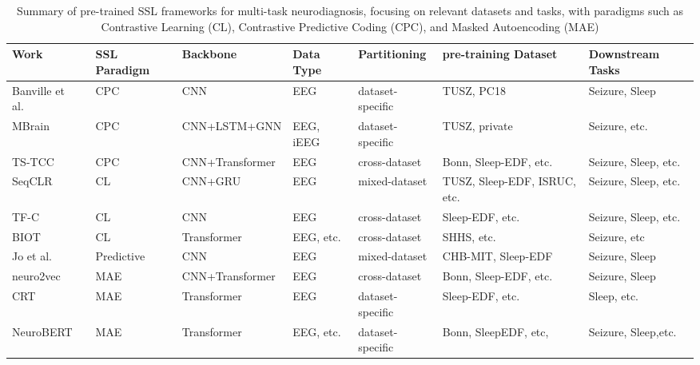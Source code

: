 \begin{table*}[t]
\renewcommand{\arraystretch}{1.2}
\caption{Summary of pre-trained SSL frameworks for multi-task neurodiagnosis, focusing on relevant datasets and tasks, with paradigms such as Contrastive Learning (CL), Contrastive Predictive Coding (CPC), and Masked Autoencoding (MAE)}
\label{tab:pts}
\footnotesize
\centering
\begin{tabular}
{p{2.1cm}p{1.9cm}p{2.1cm}p{1.4cm}p{1.8cm}p{3.7cm}p{2.5cm}}
\hline
\textbf{Work}        & \textbf{SSL Paradigm}                                     & \textbf{Backbone}  & \textbf{Data Type} &\textbf{Partitioning}  & \textbf{pre-training Dataset}                          & \textbf{Downstream Tasks}                           \\
\hline
Banville et al.~\cite{banville2021uncovering} & CPC & CNN & EEG & dataset-specific & TUSZ, PC18  & Seizure, Sleep  \\
MBrain~\cite{cai2023mbrain} & CPC & CNN+LSTM+GNN & EEG, iEEG&dataset-specific & TUSZ, private & Seizure, etc. \\
TS-TCC~\cite{eldele2021time}               & CPC                       & CNN+Transformer   & EEG &cross-dataset     & Bonn, Sleep-EDF, etc.                                  & Seizure, Sleep, etc.                                    \\
SeqCLR~\cite{mohsenvand2020contrastive}               & CL                                            & CNN+GRU & EEG &mixed-dataset & TUSZ, Sleep-EDF, ISRUC, etc.      & Seizure, Sleep, etc. \\
TF-C~\cite{zhang2022self}                 & CL                              & CNN  & EEG                  &cross-dataset & Sleep-EDF, etc.         & Seizure, Sleep, etc.       \\
BIOT~\cite{yang2024biot}  & CL & Transformer & EEG, etc. & cross-dataset & SHHS, etc. & Seizure, etc \\
Jo et al.~\cite{jo2023channel} & Predictive & CNN  & EEG &mixed-dataset &CHB-MIT, Sleep-EDF & Seizure, Sleep  \\
neuro2vec~\cite{wu2022neuro2vec} & MAE & CNN+Transformer & EEG &cross-dataset& Bonn, Sleep-EDF, etc.         & Seizure, Sleep \\
CRT~\cite{zhang2023self} & MAE & Transformer & EEG &dataset-specific & Sleep-EDF, etc. & Sleep, etc.\\
NeuroBERT~\cite{wu2024neuro} & MAE & Transformer & EEG, etc. & dataset-specific & Bonn, SleepEDF, etc, & Seizure, Sleep,etc. \\

\end{tabular}
\end{table*}
